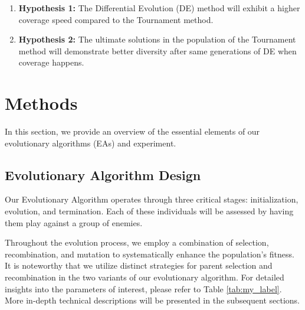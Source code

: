\begin{enumerate}[label=(\roman*)]
    \item\textbf{Hypothesis 1:} The Differential Evolution (DE) method will exhibit a higher coverage speed compared to the Tournament method.
    \item\textbf{Hypothesis 2:} The ultimate solutions in the population of the Tournament method will demonstrate better diversity after same generations of DE when coverage happens.
\end{enumerate}

\section{Methods}

In this section, we provide an overview of the essential elements of our evolutionary algorithms (EAs) and experiment. %

\subsection{Evolutionary Algorithm Design}
Our Evolutionary Algorithm operates through three critical stages: initialization, evolution, and termination. Each of these individuals will be assessed by having them play against a group of enemies.

Throughout the evolution process, we employ a combination of selection, recombination, and mutation to systematically enhance the population's fitness. It is noteworthy that we utilize distinct strategies for parent selection and recombination in the two variants of our evolutionary algorithm. For detailed insights into the parameters of interest, please refer to Table \ref{tab:my_label}. More in-depth technical descriptions will be presented in the subsequent sections.

